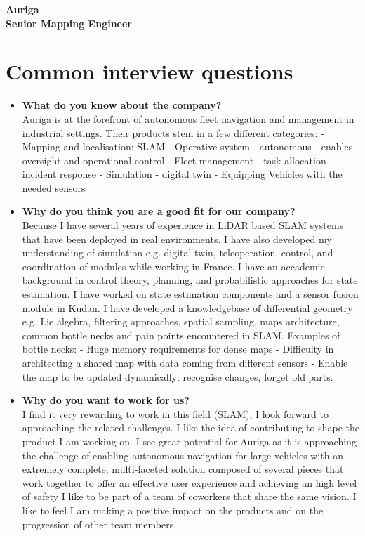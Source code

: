 


\begin{center}
 \textbf{\color{red-milano}\huge{Auriga \\ Senior Mapping Engineer}}
\end{center}


\section*{Common interview questions}
\begin{itemize}
\item \textbf{ What do you know about the company?}\\
  Auriga is at the forefront of autonomous fleet navigation and management in
  industrial settings.
  Their products stem in a few different categories:
  - Mapping and localisation: SLAM
  - Operative system - autonomous - enables oversight and operational control
  - Fleet management - task allocation - incident response
  - Simulation - digital twin
  - Equipping Vehicles with the needed sensors
\item \textbf{ Why do you think you are a good fit for our company?}\\
  Because I have several years of experience in LiDAR based SLAM systems that
  have been deployed in real environments.
  I have also developed my understanding of simulation e.g. digital twin,
  teleoperation, control, and coordination of modules while working in France.
  I have an accademic background in control theory, planning, and probabilistic
  approaches for state estimation.
  I have worked on state estimation components and a sensor fusion module in
  Kudan. I have developed a knowledgebase of differential geometry e.g. Lie
  algebra, filtering approaches, spatial sampling, maps architecture, common
  bottle necks and pain points encountered in SLAM.
  Examples of bottle necks:
  - Huge memory requirements for dense maps
  - Difficulty in architecting a shared map with data coming from different
  sensors
  - Enable the map to be updated dynamically: recognise changes, forget old
  parts.

\item \textbf{ Why do you want to work for us?}\\
  I find it very rewarding to work in this field (SLAM), I look forward to
  approaching the related challenges.
  I like the idea of contributing to shape the product I am working on.
  I see great potential for Auriga as it is approaching the challenge of
  enabling autonomous navigation for large vehicles with an extremely complete,
  multi-faceted solution composed of several pieces that work together to offer
  an effective user experience and achieving an high level of safety
  I like to be part of a team of coworkers that share the same vision. I like to
  feel I am making a positive impact on the products and on the progression of
  other team members.
  \end{itemize}







